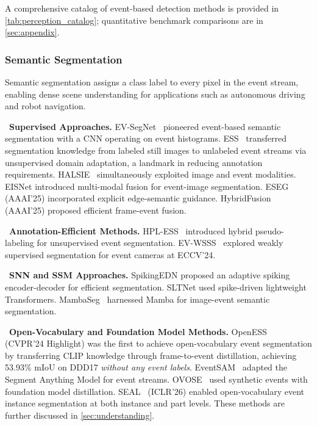 A comprehensive catalog of event-based detection methods is provided in \cref{tab:perception_catalog}; quantitative benchmark comparisons are in \cref{sec:appendix}.


\subsubsection{Semantic Segmentation}
\label{sec:perception_seg}

Semantic segmentation assigns a class label to every pixel in the event stream, enabling dense scene understanding for applications such as autonomous driving and robot navigation.

\noindent{}~\textbf{Supervised Approaches.} EV-SegNet~\cite{alonso2019evsegnet} pioneered event-based semantic segmentation with a CNN operating on event histograms. ESS~\cite{sun2022ess} transferred segmentation knowledge from labeled still images to unlabeled event streams via unsupervised domain adaptation, a landmark in reducing annotation requirements. HALSIE~\cite{biber2024halsie} simultaneously exploited image and event modalities. EISNet introduced multi-modal fusion for event-image segmentation. ESEG~\cite{li2025eseg} (AAAI'25) incorporated explicit edge-semantic guidance. HybridFusion (AAAI'25) proposed efficient frame-event fusion.

\noindent{}~\textbf{Annotation-Efficient Methods.} HPL-ESS~\cite{liu2024hpless} introduced hybrid pseudo-labeling for unsupervised event segmentation. EV-WSSS~\cite{wang2024evwsss} explored weakly supervised segmentation for event cameras at ECCV'24.

\noindent{}~\textbf{SNN and SSM Approaches.} SpikingEDN proposed an adaptive spiking encoder-decoder for efficient segmentation. SLTNet used spike-driven lightweight Transformers. MambaSeg~\cite{chen2024mambaseg} harnessed Mamba for image-event semantic segmentation.

\noindent{}~\textbf{Open-Vocabulary and Foundation Model Methods.} OpenESS~\cite{kong2024openess} (CVPR'24 Highlight) was the first to achieve open-vocabulary event segmentation by transferring CLIP knowledge through frame-to-event distillation, achieving 53.93\% mIoU on DDD17 \textit{without any event labels}. EventSAM~\cite{chen2024eventsam} adapted the Segment Anything Model for event streams. OVOSE~\cite{bendali2024ovose} used synthetic events with foundation model distillation. SEAL~\cite{li2026seal} (ICLR'26) enabled open-vocabulary event instance segmentation at both instance and part levels. These methods are further discussed in \cref{sec:understanding}.

